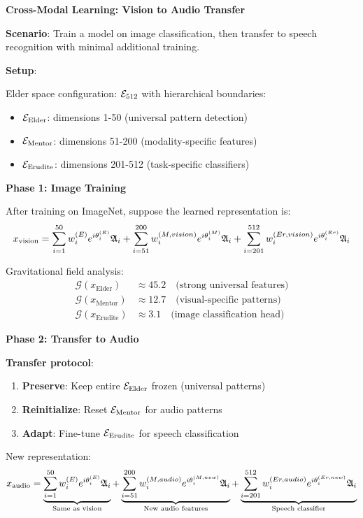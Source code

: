 \begin{application}
\textbf{Cross-Modal Learning: Vision to Audio Transfer}

\textbf{Scenario}: Train a model on image classification, then transfer to speech recognition with minimal additional training.

\textbf{Setup}:

Elder space configuration: $\mathcal{E}_{512}$ with hierarchical boundaries:
\begin{itemize}
\item $\mathcal{E}_{\text{Elder}}$: dimensions 1-50 (universal pattern detection)
\item $\mathcal{E}_{\text{Mentor}}$: dimensions 51-200 (modality-specific features)
\item $\mathcal{E}_{\text{Erudite}}$: dimensions 201-512 (task-specific classifiers)
\end{itemize}

\textbf{Phase 1: Image Training}

After training on ImageNet, suppose the learned representation is:
$$x_{\text{vision}} = \sum_{i=1}^{50} w_i^{(E)} e^{i\theta_i^{(E)}}\mathfrak{A}_{i} + \sum_{i=51}^{200} w_i^{(M,vision)} e^{i\theta_i^{(M)}}\mathfrak{A}_{i} + \sum_{i=201}^{512} w_i^{(Er,vision)} e^{i\theta_i^{(Er)}}\mathfrak{A}_{i}$$

Gravitational field analysis:
\begin{align}
\mathcal{G}(x_{\text{Elder}}) &\approx 45.2 \quad \text{(strong universal features)} \\
\mathcal{G}(x_{\text{Mentor}}) &\approx 12.7 \quad \text{(visual-specific patterns)} \\
\mathcal{G}(x_{\text{Erudite}}) &\approx 3.1 \quad \text{(image classification head)}
\end{align}

\textbf{Phase 2: Transfer to Audio}

\textbf{Transfer protocol}:
\begin{enumerate}
\item \textbf{Preserve}: Keep entire $\mathcal{E}_{\text{Elder}}$ frozen (universal patterns)
\item \textbf{Reinitialize}: Reset $\mathcal{E}_{\text{Mentor}}$ for audio patterns
\item \textbf{Adapt}: Fine-tune $\mathcal{E}_{\text{Erudite}}$ for speech classification
\end{enumerate}

New representation:
$$x_{\text{audio}} = \underbrace{\sum_{i=1}^{50} w_i^{(E)} e^{i\theta_i^{(E)}}\mathfrak{A}_{i}}_{\text{Same as vision}} + \underbrace{\sum_{i=51}^{200} w_i^{(M,audio)} e^{i\theta_i^{(M,new)}}\mathfrak{A}_{i}}_{\text{New audio features}} + \underbrace{\sum_{i=201}^{512} w_i^{(Er,audio)} e^{i\theta_i^{(Er,new)}}\mathfrak{A}_{i}}_{\text{Speech classifier}}$$


\end{application}
